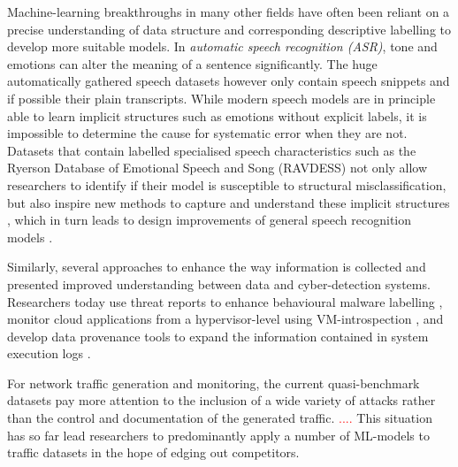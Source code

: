 \documentclass[runningheads]{llncs}
\begin{document}
Machine-learning breakthroughs in many other fields have often been reliant on a precise understanding of data structure and corresponding descriptive labelling to develop more suitable models.
In \textit{automatic speech recognition (ASR)}, tone and emotions can alter the meaning of a sentence significantly. The huge automatically gathered speech datasets however only contain speech snippets and if possible their plain transcripts. While modern speech models are in principle able to learn implicit structures such as emotions without explicit labels, it is impossible to determine the cause for systematic error when they are not. Datasets that contain labelled specialised speech characteristics such as the Ryerson Database of Emotional Speech and Song (RAVDESS) \cite{livingstone2018ryerson} not only allow researchers to identify if their model is susceptible to structural misclassification, but also inspire new methods to capture and understand these implicit structures \cite{haque2019audio}, which in turn leads to design improvements of general speech recognition models \cite{kamper2020multilingual}.


Similarly, several approaches to enhance the way information is collected and presented improved understanding between data and cyber-detection systems. Researchers today use threat reports to enhance behavioural malware labelling \cite{smith2020mind}, monitor cloud applications from a hypervisor-level using VM-introspection \cite{dolan2011virtuoso}, and develop data provenance tools to expand the information contained in system execution logs \cite{barre2019mining}. 

For network traffic generation and monitoring, the current quasi-benchmark datasets pay more attention to the inclusion of a wide variety of attacks rather than the control and documentation of the generated traffic. \textcolor{red}{....} This situation has so far lead researchers to predominantly apply a number of ML-models to traffic datasets in the hope of edging out competitors.%
\end{document}
